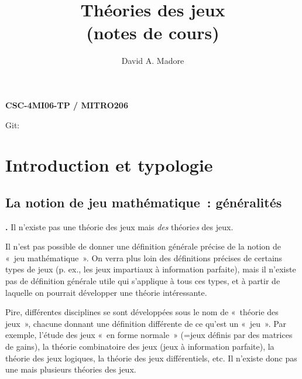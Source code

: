 \documentclass[12pt,a4paper]{article}
\theoremstyle{definition}
\newcommand\thingy{%
\refstepcounter{comcnt}\smallskip\noindent\textbf{\thecomcnt.} }
\begin{document}
\title{Théories des jeux\\(notes de cours)}
\author{David A. Madore}
\maketitle

\centerline{\textbf{CSC-4MI06-TP / MITRO206}}

{\footnotesize
\immediate{}
\begin{center}
Git: 
\end{center}
\immediate{}
\par}




%
%
%

{\footnotesize
\tableofcontents
\par}

\bigbreak

\section{Introduction et typologie}

\subsection{La notion de jeu mathématique : généralités}

\thingy Il n'existe pas une théorie des jeux mais \emph{des}
théorie\emph{s} des jeux.

Il n'est pas possible de donner une définition générale
précise de la notion de « jeu mathématique ».  On verra plus loin des
définitions précises de certains types de jeux (p. ex., les jeux
impartiaux à information parfaite), mais il n'existe pas de définition
générale utile qui s'applique à tous ces types, et à partir de
laquelle on pourrait développer une théorie intéressante.

Pire, différentes disciplines se sont développées sous le nom de
« théorie des jeux », chacune donnant une définition différente de ce
qu'est un « jeu ».  Par exemple, l'étude des jeux « en forme normale »
(=jeux définis par des matrices de gains), la théorie combinatoire des
jeux (jeux à information parfaite), la théorie des jeux logiques, la
théorie des jeux différentiels, etc.  Il n'existe donc pas une mais
plusieurs théories des jeux.
\end{document}
